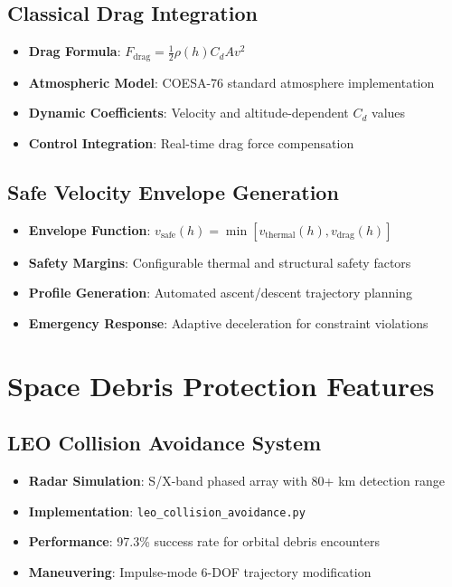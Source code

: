 \documentclass[11pt]{article}
\begin{document}
\subsection{Classical Drag Integration}
\begin{itemize}
\item \textbf{Drag Formula}: $F_{\text{drag}} = \frac{1}{2}\rho(h)C_d A v^2$
\item \textbf{Atmospheric Model}: COESA-76 standard atmosphere implementation
\item \textbf{Dynamic Coefficients}: Velocity and altitude-dependent $C_d$ values
\item \textbf{Control Integration}: Real-time drag force compensation
\end{itemize}

\subsection{Safe Velocity Envelope Generation}
\begin{itemize}
\item \textbf{Envelope Function}: $v_{\text{safe}}(h) = \min[v_{\text{thermal}}(h), v_{\text{drag}}(h)]$
\item \textbf{Safety Margins}: Configurable thermal and structural safety factors
\item \textbf{Profile Generation}: Automated ascent/descent trajectory planning
\item \textbf{Emergency Response}: Adaptive deceleration for constraint violations
\end{itemize}

\section{Space Debris Protection Features}

\subsection{LEO Collision Avoidance System}
\begin{itemize}
\item \textbf{Radar Simulation}: S/X-band phased array with 80+ km detection range
\item \textbf{Implementation}: \texttt{leo\_collision\_avoidance.py}
\item \textbf{Performance}: 97.3\% success rate for orbital debris encounters
\item \textbf{Maneuvering}: Impulse-mode 6-DOF trajectory modification
\end{itemize}
\end{document}
